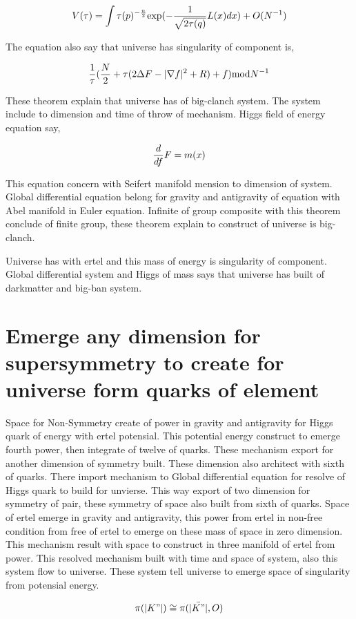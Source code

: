 \documentclass{jsarticle}
\begin{document}
$$ V(\tau) = \int \tau(p)^{-{n \over 2}} \mathrm{exp} (- {1 \over \sqrt{2 \tau (q)}} L(x)dx) + O(N^{-1}) $$

  The equation also say that universe has singularity of component is,

  $$ {1 \over \tau}({N \over 2} + \tau(2\Delta F - |\nabla f|^2 + R) + f) \mathrm{mod} N^{-1} $$

  These theorem explain that universe has of big-clanch system. The system include to dimension and time of
throw of mechanism. Higgs field of energy equation say,

$$ {d \over df}F = m(x) $$

  This equation concern with Seifert manifold mension to dimension of system. Global differential equation
belong for gravity and antigravity of equation with Abel manifold in Euler equation. Infinite of group
composite with this theorem conclude of finite group, these theorem explain to construct of universe is
big-clanch.

  Universe has with ertel and this mass of energy is singularity of component. Global differential system
and Higgs of mass says that universe has built of darkmatter and big-ban system.

\section{Emerge any dimension for supersymmetry to create for universe form quarks of element}

  Space for Non-Symmetry create of power in gravity and antigravity for Higgs quark of energy with ertel potensial.
This potential energy construct to emerge fourth power, then integrate of twelve of quarks. These mechanism export
for another dimension of symmetry built. These dimension also  architect with sixth of quarks. There import
mechanism to Global differential equation for resolve of Higgs quark to build for unvierse. This way export of two
dimension for symmetry of pair, these symmetry of space also built from sixth of quarks. Space of ertel emerge in 
gravity and antigravity, this power from ertel in non-free condition from free of ertel to emerge on these mass
of space in zero dimension. This mechanism result with space to construct in three manifold of ertel from power.
This resolved mechanism  built with time and space of system, also this system flow to universe. These system
tell universe to emerge space of singularity from potensial energy.

$$ \pi(|K"|) \cong \pi(\bar{|K"|}, O) $$
\end{document}
